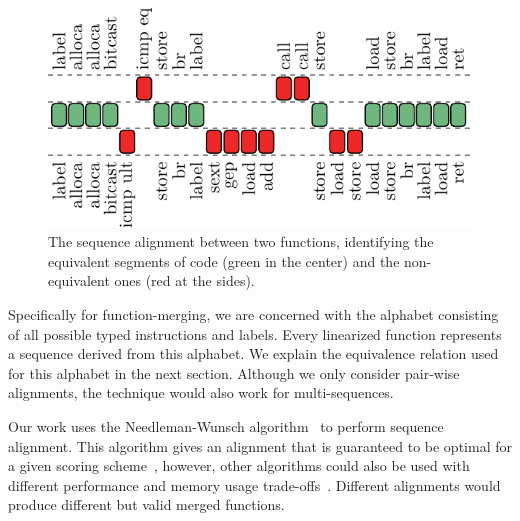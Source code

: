 \begin{figure}[t]
  \centering
  \includegraphics[width=0.75\linewidth]{figs/opcode-align.pdf}
  \caption{The sequence alignment between two functions, identifying the equivalent segments of code (green in the center) and the non-equivalent ones (red at the sides).}
  \label{fig:opcode-align}
\end{figure}

Specifically for function-merging, we are concerned with the alphabet
consisting of all possible typed instructions and labels.
Every linearized function represents a sequence derived from this alphabet.
We explain the equivalence relation used for this alphabet in the next section.
Although we only consider pair-wise alignments, the technique would also work
for multi-sequences.


Our work uses the Needleman-Wunsch algorithm~\cite{needleman70} to perform sequence alignment.
This algorithm gives an alignment that is guaranteed to be optimal for a given scoring scheme~\cite{higgins89},
however, other algorithms could also be used with different performance and memory usage trade-offs~\cite{needleman70,smith81,carrillo88,hickey11}.
Different alignments would produce different but valid merged functions.

